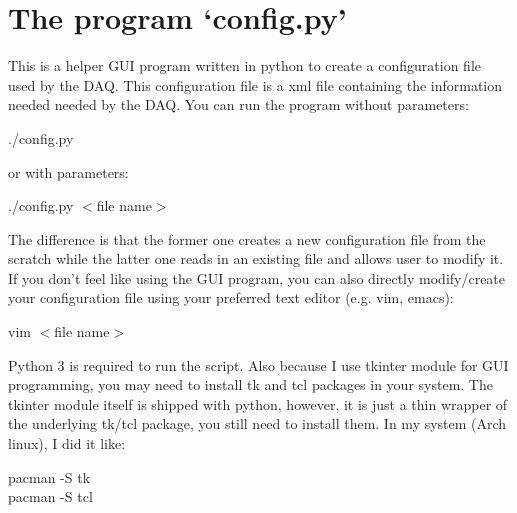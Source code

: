 \documentclass[a4paper,12pt]{article}
\begin{document}
	 \section{The program `config.py'} This is a helper GUI program written in
	 python to create a
	 configuration file used by the DAQ. This configuration file is a xml
	 file containing the information needed needed by the DAQ. You can run
	 the program without parameters:
	 \begin{tcolorbox}
	 ./config.py
	 \end{tcolorbox}
	 or with parameters:
	 \begin{tcolorbox}
	 ./config.py $<$file name$>$
	 \end{tcolorbox}
	 The difference is that the former one creates a new configuration file
	 from the scratch while the latter one reads in an existing file and
	 allows user to modify it.
	 If you don't feel like using the GUI program, you can also directly
	 modify/create your configuration file using your preferred text editor
	 (e.g. vim, emacs):
	 \begin{tcolorbox}
	 	vim $<$file name$>$
	 \end{tcolorbox}

	 Python 3 is required to run the script. Also because I use tkinter
	 module for GUI programming, you may need to install tk and tcl packages
	 in your system. The tkinter module itself is shipped with python,
	 however, it is just a thin wrapper of the underlying tk/tcl package,
	 you still need to install them. In my system (Arch linux), I did it
	 like:
	 \begin{tcolorbox}
	 	pacman -S tk\\
		pacman -S tcl
	 \end{tcolorbox}
\end{document}
